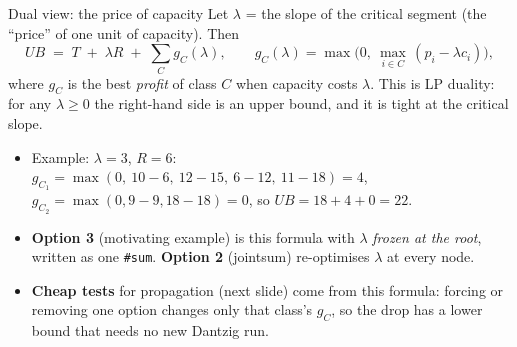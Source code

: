 \documentclass[aspectratio=169,11pt]{beamer}
\begin{document}
\begin{frame}{Dual view: the price of capacity}
\footnotesize
Let $\lambda$ = the slope of the critical segment (the ``price'' of one unit of capacity). Then
\[
UB \;=\; T \;+\; \lambda R \;+\; \sum_C g_C(\lambda), \qquad
g_C(\lambda) = \max\big(0,\ \max_{i\in C}\,(p_i - \lambda c_i)\big),
\]
where $g_C$ is the best \emph{profit} of class $C$ when capacity costs $\lambda$. This is LP duality: for any
$\lambda \ge 0$ the right-hand side is an upper bound, and it is tight at the critical slope.
\vspace{1mm}
\begin{itemize}\setlength\itemsep{2pt}
\item Example: $\lambda = 3$, $R = 6$: $g_{C_1} = \max(0,\ 10{-}6,\ 12{-}15,\ 6{-}12,\ 11{-}18) = 4$,
  $g_{C_2} = \max(0, 9{-}9, 18{-}18) = 0$, so $UB = 18 + 4 + 0 = 22$. \checkmark
\item \textbf{Option 3} (motivating example) is this formula with $\lambda$ \emph{frozen at the root}, written as one
  \texttt{\#sum}. \textbf{Option 2} (jointsum) re-optimises $\lambda$ at every node.
\item \textbf{Cheap tests} for propagation (next slide) come from this formula: forcing or removing one option changes
  only that class's $g_C$, so the drop has a lower bound that needs no new Dantzig run.
\end{itemize}
\end{frame}
\end{document}
